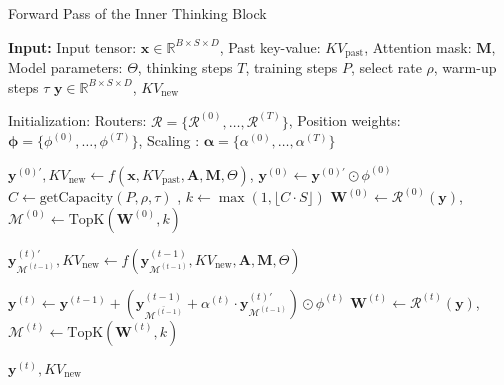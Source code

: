 \begin{algorithm*}[h]
\small
\caption{Forward Pass of the Inner Thinking Block}
\label{alg:l4resrep-posmodblockv1}
\begin{algorithmic}[1]
\Require 
    \textbf{Input:} Input tensor: $\mathbf{x} \in \mathbb{R}^{B \times S \times D}$, 
    Past key-value: $KV_{\text{past}}$, Attention mask: $\mathbf{M}$,
    Model parameters: $\Theta$, thinking steps $T$, training steps $P$, select rate $\rho$, warm-up steps $\tau$ 
\Ensure 
    $\mathbf{y} \in \mathbb{R}^{B \times S \times D}$, $KV_{\text{new}}$ 

\Statex Initialization: Routers: $\mathcal{R} = \{\mathcal{R}^{(0)}, \dots, \mathcal{R}^{(T)}\}$, 
Position weights: $\boldsymbol{\phi} = \{\phi^{(0)}, \dots, \phi^{(T)}\}$,  Scaling : $\boldsymbol{\alpha} = \{\alpha^{(0)},\dots, \alpha^{(T)}\}$ 

\State $\mathbf{y}^{(0)\prime}, KV_{\text{new}} \gets f(\mathbf{x}, KV_{\text{past}}, \mathbf{A}, \mathbf{M}, \Theta)$, \quad  $\mathbf{y}^{(0)} \gets \mathbf{y}^{(0)\prime} \odot \phi^{(0)}$ 
\State  $C \gets \text{getCapacity}(P, \rho, \tau)$ , \quad $k \gets \max(1, \lfloor C \cdot S \rfloor)$ 
\State  $\mathbf{W}^{(0)} \gets \mathcal{R}^{(0)}(\mathbf{y})$, \quad  $\mathcal{M}^{(0)} \gets \text{TopK}(\mathbf{W}^{(0)}, k)$ 

 
   
    
    
    
    \Statex \quad $\mathbf{y}_{\mathcal{M}^{(t-1)}}^{(t)\prime}, KV_{\text{new}} \gets f(\mathbf{y}^{(t-1)}_{\mathcal{M}^{(t-1)}}, KV_{\text{new}},  \mathbf{A}, \mathbf{M}, \Theta)$ 
    
    \Statex \quad $\mathbf{y}^{(t)} \gets \mathbf{y}^{(t-1)} + (\mathbf{y}^{(t-1)}_{\overline{\mathcal{M}^{(t-1)}}} +\alpha^{(t)}\cdot \mathbf{y}^{(t)\prime}_{\mathcal{M}^{(t-1)}}) \odot \phi^{(t)}$ 
     \Statex \quad $\mathbf{W}^{(t)} \gets \mathcal{R}^{(t)}(\mathbf{y})$, \quad $\mathcal{M}^{(t)} \gets \text{TopK}(\mathbf{W}^{(t)}, k)$ 
\EndFor

\State \Return $\mathbf{y}^{(t)}, KV_{\text{new}}$

\end{algorithmic}
\end{algorithm*}